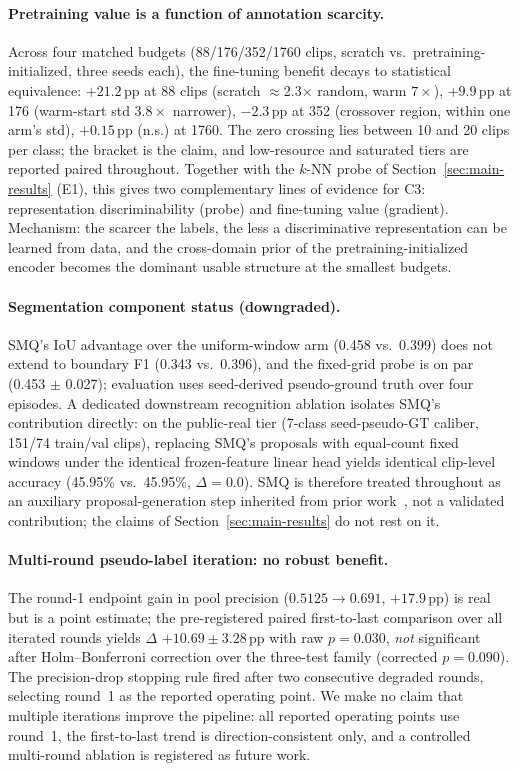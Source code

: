 \paragraph{Pretraining value is a function of annotation scarcity.}
Across four matched budgets (88/176/352/1760 clips, scratch vs.\ pretraining-initialized, three seeds each), the fine-tuning benefit decays to statistical equivalence: $+21.2$\,pp at 88 clips (scratch $\approx$2.3$\times$ random, warm $7\times$), $+9.9$\,pp at 176 (warm-start std $3.8\times$ narrower), $-2.3$\,pp at 352 (crossover region, within one arm's std), $+0.15$\,pp (n.s.) at 1760. The zero crossing lies between 10 and 20 clips per class; the bracket is the claim, and low-resource and saturated tiers are reported paired throughout. Together with the $k$-NN probe of Section~\ref{sec:main-results} (E1), this gives two complementary lines of evidence for C3: representation discriminability (probe) and fine-tuning value (gradient). Mechanism: the scarcer the labels, the less a discriminative representation can be learned from data, and the cross-domain prior of the pretraining-initialized encoder becomes the dominant usable structure at the smallest budgets.

\paragraph{Segmentation component status (downgraded).}
SMQ's IoU advantage over the uniform-window arm (0.458 vs.\ 0.399) does not extend to boundary F1 (0.343 vs.\ 0.396), and the fixed-grid probe is on par (0.453 $\pm$ 0.027); evaluation uses seed-derived pseudo-ground truth over four episodes. A dedicated downstream recognition ablation isolates SMQ's contribution directly: on the public-real tier (7-class seed-pseudo-GT caliber, 151/74 train/val clips), replacing SMQ's proposals with equal-count fixed windows under the identical frozen-feature linear head yields identical clip-level accuracy (45.95\% vs.\ 45.95\%, $\Delta = 0.0$). SMQ is therefore treated throughout as an auxiliary proposal-generation step inherited from prior work~\citep{gokay2025smq}, not a validated contribution; the claims of Section~\ref{sec:main-results} do not rest on it.

\paragraph{Multi-round pseudo-label iteration: no robust benefit.}
The round-1 endpoint gain in pool precision ($0.5125 \to 0.691$, $+17.9$\,pp) is real but is a point estimate; the pre-registered paired first-to-last comparison over all iterated rounds yields $\Delta$ $+10.69 \pm 3.28$\,pp with raw $p=0.030$, \emph{not} significant after Holm--Bonferroni correction over the three-test family (corrected $p=0.090$). The precision-drop stopping rule fired after two consecutive degraded rounds, selecting round~1 as the reported operating point. We make no claim that multiple iterations improve the pipeline: all reported operating points use round~1, the first-to-last trend is direction-consistent only, and a controlled multi-round ablation is registered as future work.

